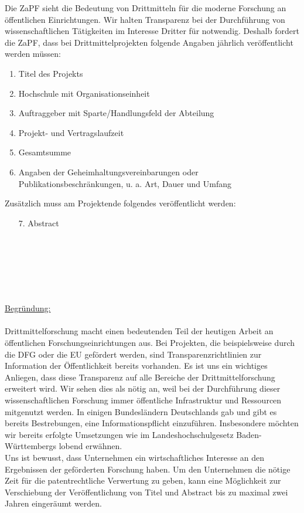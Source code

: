 \documentclass[DIV=9]{scrartcl}
\begin{document}
\begin{minipage}{\textwidth}
Die ZaPF sieht die Bedeutung von Drittmitteln für die moderne Forschung an öffentlichen Einrichtungen. Wir halten Transparenz bei der Durchführung von wissenschaftlichen Tätigkeiten im Interesse Dritter für notwendig. Deshalb fordert die ZaPF, dass bei Drittmittelprojekten folgende Angaben jährlich veröffentlicht werden müssen:\\
\begin{enumerate}
\item Titel des Projekts \footnotemark[1]
\item Hochschule mit Organisationseinheit
\item Auftraggeber mit Sparte/Handlungsfeld der Abteilung \footnotemark[2]
\item Projekt- und Vertragslaufzeit 
\item Gesamtsumme
\item Angaben der Geheimhaltungsvereinbarungen oder Publikationsbeschränkungen, u. a. Art, Dauer und Umfang
\end{enumerate}
Zusätzlich muss am Projektende folgendes veröffentlicht werden:
\begin{enumerate}
\item[7.] Abstract \footnotemark[1]
\end{enumerate}
~\\
\end{minipage}
~\\\\\\\\
\underline{Begründung:}\\\\
Drittmittelforschung macht einen bedeutenden Teil der heutigen Arbeit an öffentlichen Forschungseinrichtungen aus. Bei Projekten, die beispielsweise durch die DFG oder die EU gefördert werden, sind Transparenzrichtlinien zur Information der Öffentlichkeit bereits vorhanden. Es ist uns ein wichtiges Anliegen, dass diese Transparenz auf alle Bereiche der Drittmittelforschung erweitert wird. Wir sehen dies als nötig an, weil bei der Durchführung dieser wissenschaftlichen Forschung immer öffentliche Infrastruktur und Ressourcen mitgenutzt werden. In einigen Bundesländern Deutschlands gab und gibt es bereits Bestrebungen, eine Informationspflicht einzuführen. Insbesondere möchten wir bereits erfolgte Umsetzungen wie im Landeshochschulgesetz Baden-Württembergs lobend erwähnen.\\
Uns ist bewusst, dass Unternehmen ein wirtschaftliches Interesse an den Ergebnissen der geförderten Forschung haben. Um den Unternehmen die nötige Zeit für die patentrechtliche Verwertung zu geben, kann eine Möglichkeit zur Verschiebung der Veröffentlichung von Titel und Abstract bis zu maximal zwei Jahren eingeräumt werden.
\end{document}
